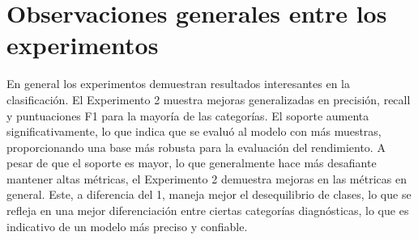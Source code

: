 \section*{Observaciones generales entre los experimentos}

En general los experimentos demuestran resultados interesantes en la clasificación. El Experimento 2 muestra mejoras generalizadas en precisión, recall y puntuaciones F1 para la mayoría de las categorías. El soporte aumenta significativamente, lo que indica que se evaluó al modelo con más muestras, proporcionando una base más robusta para la evaluación del rendimiento. A pesar de que el soporte es mayor, lo que generalmente hace más desafiante mantener altas métricas, el Experimento 2 demuestra mejoras en las métricas en general. Este, a diferencia del 1, maneja mejor el desequilibrio de clases, lo que se refleja en una mejor diferenciación entre ciertas categorías diagnósticas, lo que es indicativo de un modelo más preciso y confiable.


    
